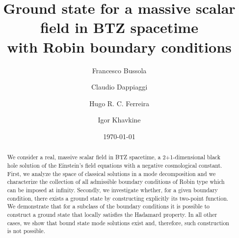 \documentclass[aps, prd, amsmath, floats, floatfix, twocolumn, nofootinbib, superscriptaddress, showpacs]{revtex4-1}
\begin{document}

\title{Ground state for a massive scalar field in BTZ spacetime \\ with Robin boundary conditions}



\author{Francesco Bussola}

\author{Claudio Dappiaggi}

\author{Hugo R. C. Ferreira}

\author{Igor Khavkine}



\date{\today}



\begin{abstract}
We consider a real, massive scalar field in BTZ spacetime, a 2+1-dimensional black hole solution of the Einstein's field equations with a negative cosmological constant. First, we analyze the space of classical solutions in a mode decomposition and we characterize the collection of all admissible boundary conditions of Robin type which can be imposed at infinity. Secondly, we investigate whether, for a given boundary condition, there exists a ground state by constructing explicitly its two-point function. We demonstrate that for a subclass of the boundary conditions it is possible to construct a ground state that locally satisfies the Hadamard property. In all other cases, we show that bound state mode solutions exist and, therefore, such construction is not possible.
%
\vspace*{7ex}
\end{abstract}
\end{document}
